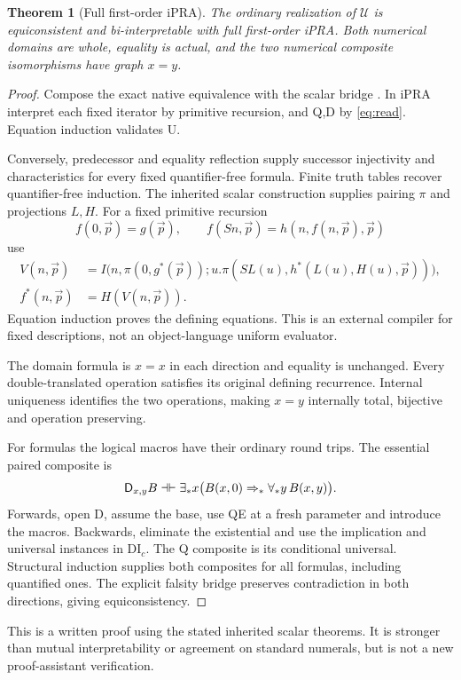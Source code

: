 \documentclass[11pt]{article}
\newtheorem{theorem}{Theorem}[section]
\begin{document}
\begin{theorem}[Full first-order iPRA]
The ordinary realization of $\mathcal U$ is equiconsistent and
bi-interpretable with full first-order iPRA. Both numerical domains are
whole, equality is actual, and the two numerical composite isomorphisms
have graph $x=y$.
\end{theorem}
\begin{proof}
Compose the exact native equivalence with the scalar bridge
\cite{bridge}. In iPRA interpret each fixed iterator by primitive
recursion, and Q,D by \eqref{eq:read}. Equation induction validates U.

Conversely, predecessor and equality reflection supply successor
injectivity and characteristics for every fixed quantifier-free formula.
Finite truth tables recover quantifier-free induction. The inherited
scalar construction supplies pairing $\pi$ and projections $L,H$.
For a fixed primitive recursion
\[
 f(0,\vec p)=g(\vec p),\qquad
 f(Sn,\vec p)=h(n,f(n,\vec p),\vec p)
\]
use
\[
\begin{split}
 V(n,\vec p)&=I\bigl(n,\pi(0,g^*(\vec p));
        u.\pi(SL(u),h^*(L(u),H(u),\vec p))\bigr),\\
 f^*(n,\vec p)&=H(V(n,\vec p)).
\end{split}
\]
Equation induction proves the defining equations. This is an external
compiler for fixed descriptions, not an object-language uniform evaluator.

The domain formula is $x=x$ in each direction and equality is unchanged.
Every double-translated operation satisfies its original defining
recurrence. Internal uniqueness identifies the two operations, making
$x=y$ internally total, bijective and operation preserving.

For formulas the logical macros have their ordinary round trips.
The essential paired composite is
\[
 \mathsf D_{x,y}B\dashv\vdash
 \exists_*x\bigl(B(x,0)\Rightarrow_*\forall_*y\,B(x,y)\bigr).
\]
Forwards, open D, assume the base, use QE at a fresh parameter and
introduce the macros. Backwards, eliminate the existential and use
the implication and universal instances in DI$_c$.
The Q composite is its conditional universal. Structural induction
supplies both composites for all formulas, including quantified ones.
The explicit falsity bridge preserves contradiction in both directions,
giving equiconsistency.
\end{proof}
This is a written proof using the stated inherited scalar theorems.
It is stronger than mutual interpretability or agreement on standard
numerals, but is not a new proof-assistant verification.
\end{document}
